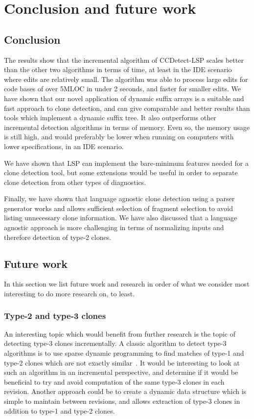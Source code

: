 \chapter{Conclusion and future work}

\section{Conclusion}

The results show that the incremental algorithm of CCDetect-LSP scales better than the
other two algorithms in terms of time, at least in the IDE scenario where edits are
relatively small. The algorithm was able to process large edits for code bases of over
5MLOC in under 2 seconds, and faster for smaller edits. We have shown that our novel
application of dynamic suffix arrays is a suitable and fast approach to clone detection,
and can give comparable and better results than tools which implement a dynamic suffix
tree. It also outperforms other incremental detection algorithms in terms of memory. Even
so, the memory usage is still high, and would preferably be lower when running on
computers with lower specifications, in an IDE scenario. 

We have shown that LSP can implement the bare-minimum features needed for a clone
detection tool, but some extensions would be useful in order to separate clone detection
from other types of diagnostics.

Finally, we have shown that language agnostic clone detection using a parser generator
works and allows sufficient selection of fragment selection to avoid listing unnecessary
clone information. We have also discussed that a language agnostic approach is more
challenging in terms of normalizing inputs and therefore detection of type-2 clones.

\section{Future work}

In this section we list future work and research in order of what we consider
most interesting to do more research on, to least.

\subsection*{Type-2 and type-3 clones}

An interesting topic which would benefit from further research is the topic of detecting
type-3 clones incrementally. A classic algorithm to detect type-3 algorithms is to use
sparse dynamic programming to find matches of type-1 and type-2 clones which are not
exactly similar~\cite{BakerSparseDynamicProgramming}. It would be interesting to look at
such an algorithm in an incremental perspective, and determine if it would be beneficial
to try and avoid computation of the same type-3 clones in each revision. Another approach
could be to create a dynamic data structure which is simple to maintain between revisions,
and allows extraction of type-3 clones in addition to type-1 and type-2 clones.

